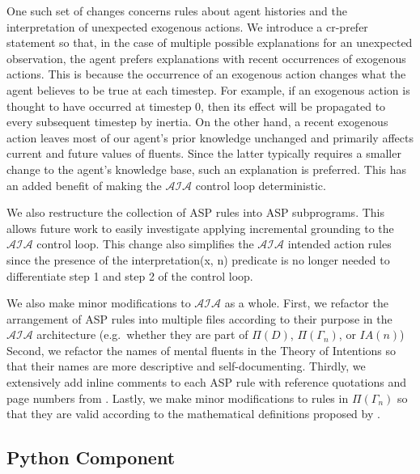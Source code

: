 
One such set of changes concerns rules about agent histories and the interpretation of unexpected exogenous actions.
We introduce a cr-prefer statement so that, in the case of multiple possible explanations for an unexpected observation, the agent prefers explanations with recent occurrences of exogenous actions.
This is because the occurrence of an exogenous action changes what the agent believes to be true at each timestep.
For example, if an exogenous action is thought to have occurred at timestep 0, then its effect will be propagated to every subsequent timestep by inertia.
On the other hand, a recent exogenous action leaves most of our agent's prior knowledge unchanged and primarily affects current and future values of fluents.
Since the latter typically requires a smaller change to the agent's knowledge base, such an explanation is preferred.
This has an added benefit of making the $\mathcal{AIA}$ control loop deterministic.

We also restructure the collection of ASP rules into ASP subprograms.
This allows future work to easily investigate applying incremental grounding to the $\mathcal{AIA}$ control loop.
This change also simplifies the $\mathcal{AIA}$ intended action rules since the presence of the interpretation(x, n) predicate is no longer needed to differentiate step 1 and step 2 of the control loop.

We also make minor modifications to $\mathcal{AIA}$ as a whole.
First, we refactor the arrangement of ASP rules into multiple files according to their purpose in the $\mathcal{AIA}$ architecture (e.g.~whether they are part of $\Pi(D)$, $\Pi(\Gamma_n)$, or $IA(n)$)
Second, we refactor the names of mental fluents in the Theory of Intentions so that their names are more descriptive and self-documenting.
Thirdly, we extensively add inline comments to each ASP rule with reference quotations and page numbers from \citet{blount_architecture_2013,blount_towards_2014}.
Lastly, we make minor modifications to rules in $\Pi(\Gamma_n)$ so that they are valid according to the mathematical definitions proposed by \citet{blount_architecture_2013,blount_towards_2014}.

\subsection{Python Component}
\label{subsec:apia_control_loop}

